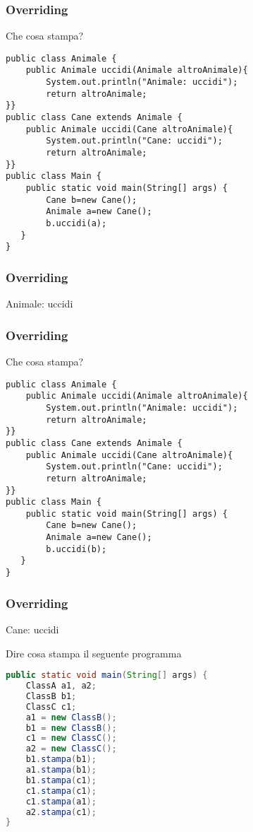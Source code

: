 \documentclass{beamer}
\begin{document}
\begin{frame}[fragile]
\frametitle{Overriding}
\begin{framed}
Che cosa stampa?
\begin{lstlisting}
public class Animale {
	public Animale uccidi(Animale altroAnimale){
	    System.out.println("Animale: uccidi");
	    return altroAnimale;
}}
public class Cane extends Animale {
	public Animale uccidi(Cane altroAnimale){
	    System.out.println("Cane: uccidi");
	    return altroAnimale;
}}
public class Main {
    public static void main(String[] args) {
        Cane b=new Cane();
        Animale a=new Cane();
        b.uccidi(a);
   }
}
\end{lstlisting}
\end{framed}
\end{frame}

\begin{frame}[fragile]
\frametitle{Overriding}
\begin{framed}
Animale: uccidi
\end{framed}
\end{frame}


\begin{frame}[fragile]
\frametitle{Overriding}
\begin{framed}
Che cosa stampa?
\begin{lstlisting}
public class Animale {
    public Animale uccidi(Animale altroAnimale){
        System.out.println("Animale: uccidi");
        return altroAnimale;
}}
public class Cane extends Animale {
    public Animale uccidi(Cane altroAnimale){
        System.out.println("Cane: uccidi");
        return altroAnimale;
}}
public class Main {
    public static void main(String[] args) {
        Cane b=new Cane();
        Animale a=new Cane();
        b.uccidi(b);
   }
}
\end{lstlisting}
\end{framed}
\end{frame}

\begin{frame}[fragile]
\frametitle{Overriding}
\begin{framed}
Cane: uccidi
\end{framed}
\end{frame}

\begin{frame}[fragile]
Dire cosa stampa il seguente programma 
\begin{lstlisting}[language=Java,escapechar=|]
public static void main(String[] args) {
    ClassA a1, a2;
    ClassB b1;
    ClassC c1;
    a1 = new ClassB();
    b1 = new ClassB();
    c1 = new ClassC();
    a2 = new ClassC();
    b1.stampa(b1); 
    a1.stampa(b1); 
    b1.stampa(c1); 
    c1.stampa(c1);
    c1.stampa(a1); 
    a2.stampa(c1); 
}
\end{lstlisting}
\end{frame}
\end{document}
